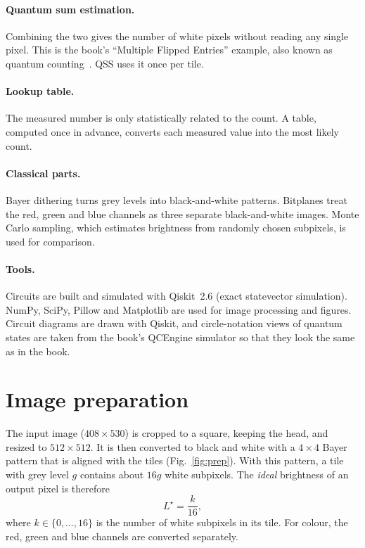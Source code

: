 \documentclass[10pt,twocolumn,a4paper]{article}
\begin{document}
\paragraph{Quantum sum estimation.}
Combining the two gives the number of white pixels without reading any single
pixel. This is the book's ``Multiple Flipped Entries'' example, also known as
quantum counting~\cite{brassard}. QSS uses it once per tile.

\paragraph{Lookup table.}
The measured number is only statistically related to the count. A table,
computed once in advance, converts each measured value into the most likely
count.

\paragraph{Classical parts.}
Bayer dithering turns grey levels into black-and-white patterns. Bitplanes
treat the red, green and blue channels as three separate black-and-white
images. Monte Carlo sampling, which estimates brightness from randomly chosen
subpixels, is used for comparison.

\paragraph{Tools.}
Circuits are built and simulated with Qiskit~2.6 (exact statevector
simulation). NumPy, SciPy, Pillow and Matplotlib are used for image processing
and figures. Circuit diagrams are drawn with Qiskit, and circle-notation views
of quantum states are taken from the book's QCEngine simulator so that they
look the same as in the book.

\section{Image preparation}\label{sec:prep}

The input image ($408\times530$) is cropped to a square, keeping the head, and
resized to $512\times512$.
It is then converted to black and white with a $4\times4$ Bayer pattern that is
aligned with the tiles (Fig.~\ref{fig:prep}).
With this pattern, a tile with grey level $g$ contains about $16g$ white
subpixels. The \emph{ideal} brightness of an output pixel is therefore
\begin{equation}
L^{\star}=\frac{k}{16},
\label{eq:ideal}
\end{equation}
where $k\in\{0,\dots,16\}$ is the number of white subpixels in its tile.
For colour, the red, green and blue channels are converted separately.
\end{document}
